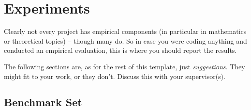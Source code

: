 \chapter{Experiments}
\label{chap:exp}



Clearly not every project has empirical components (in particular in mathematics or theoretical topics) -- though many do. So in case you were coding anything and conducted an empirical evaluation, this is where you should report the results.

The following sections are, as for the rest of this template, just \emph{suggestions}. They might fit to your work, or they don't. Discuss this with your supervisor(s).


\section{Benchmark Set}

